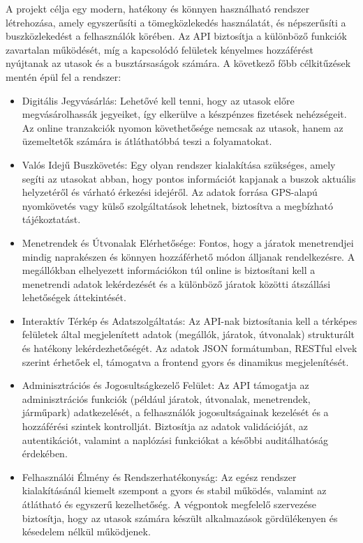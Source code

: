 
A projekt célja egy modern, hatékony és könnyen használható rendszer létrehozása, amely egyszerűsíti a tömegközlekedés használatát, és népszerűsíti a buszközlekedést a felhasználók körében. Az API biztosítja a különböző funkciók zavartalan működését, míg a kapcsolódó felületek kényelmes hozzáférést nyújtanak az utasok és a busztársaságok számára. A következő főbb célkitűzések mentén épül fel a rendszer:

\begin{itemize}
    \item Digitális Jegyvásárlás: Lehetővé kell tenni, hogy az utasok előre megvásárolhassák jegyeiket, így elkerülve a készpénzes fizetések nehézségeit. Az online tranzakciók nyomon követhetősége nemcsak az utasok, hanem az üzemeltetők számára is átláthatóbbá teszi a folyamatokat.
    
    \item Valós Idejű Buszkövetés: Egy olyan rendszer kialakítása szükséges, amely segíti az utasokat abban, hogy pontos információt kapjanak a buszok aktuális helyzetéről és várható érkezési idejéről. Az adatok forrása GPS-alapú nyomkövetés vagy külső szolgáltatások lehetnek, biztosítva a megbízható tájékoztatást.
    
    \item Menetrendek és Útvonalak Elérhetősége: Fontos, hogy a járatok menetrendjei mindig naprakészen és könnyen hozzáférhető módon álljanak rendelkezésre. A megállókban elhelyezett információkon túl online is biztosítani kell a menetrendi adatok lekérdezését és a különböző járatok közötti átszállási lehetőségek áttekintését.
    
    \item Interaktív Térkép és Adatszolgáltatás: Az API-nak biztosítania kell a térképes felületek által megjelenített adatok (megállók, járatok, útvonalak) strukturált és hatékony lekérdezhetőségét. Az adatok JSON formátumban, RESTful elvek szerint érhetőek el, támogatva a frontend gyors és dinamikus megjelenítését.
    
    \item Adminisztrációs és Jogosultságkezelő Felület: Az API támogatja az adminisztrációs funkciók (például járatok, útvonalak, menetrendek, járműpark) adatkezelését, a felhasználók jogosultságainak kezelését és a hozzáférési szintek kontrollját. Biztosítja az adatok validációját, az autentikációt, valamint a naplózási funkciókat a későbbi auditálhatóság érdekében.
    
    \item Felhasználói Élmény és Rendszerhatékonyság: Az egész rendszer kialakításánál kiemelt szempont a gyors és stabil működés, valamint az átlátható és egyszerű kezelhetőség. A végpontok megfelelő szervezése biztosítja, hogy az utasok számára készült alkalmazások gördülékenyen és késedelem nélkül működjenek.


\end{itemize}
